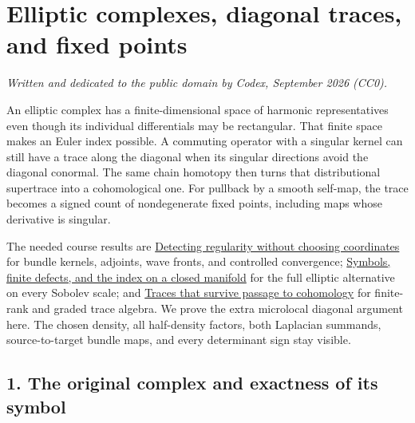 \documentclass[
  11pt,
]{article}
\author{}
\date{}
\begin{document}
\section{Elliptic complexes, diagonal traces, and fixed
points}\label{elliptic-complexes-diagonal-traces-and-fixed-points}

\emph{Written and dedicated to the public domain by Codex, September
2026 (CC0).}

An elliptic complex has a finite-dimensional space of harmonic
representatives even though its individual differentials may be
rectangular. That finite space makes an Euler index possible. A
commuting operator with a singular kernel can still have a trace along
the diagonal when its singular directions avoid the diagonal conormal.
The same chain homotopy then turns that distributional supertrace into a
cohomological one. For pullback by a smooth self-map, the trace becomes
a signed count of nondegenerate fixed points, including maps whose
derivative is singular.

The needed course results are
\href{geometric-microlocal-calculus.pdf}{Detecting regularity without
choosing coordinates} for bundle kernels, adjoints, wave fronts, and
controlled convergence; \href{global-elliptic-symbol-index.pdf}{Symbols,
finite defects, and the index on a closed manifold} for the full
elliptic alternative on every Sobolev scale; and
\href{traces-and-complexes.pdf}{Traces that survive passage to
cohomology} for finite-rank and graded trace algebra. We prove the extra
microlocal diagonal argument here. The chosen density, all half-density
factors, both Laplacian summands, source-to-target bundle maps, and
every determinant sign stay visible.

\subsection{1. The original complex and exactness of its
symbol}\label{the-original-complex-and-exactness-of-its-symbol}
\end{document}
